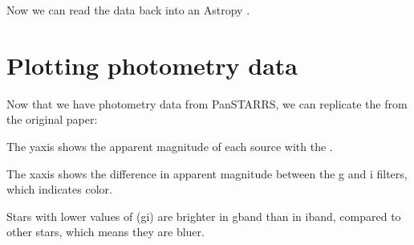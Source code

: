 \documentclass[letterpaper,10pt,english]{sphinxmanual}
\begin{document}
\begin{sphinxVerbatim}[commandchars=\\\{\}]
 
   

  
  

  
\end{sphinxVerbatim}

Now we can read the data back into an Astropy .

\begin{sphinxVerbatim}[commandchars=\\\{\}]
   

  
\end{sphinxVerbatim}


\section{Plotting photometry data}
\label{\detokenize{06_photo:plotting-photometry-data}}
Now that we have photometry data from Pan\sphinxhyphen{}STARRS, we can replicate the  from the original paper:



The y\sphinxhyphen{}axis shows the apparent magnitude of each source with the .

The x\sphinxhyphen{}axis shows the difference in apparent magnitude between the g and i filters, which indicates color.

Stars with lower values of (g\sphinxhyphen{}i) are brighter in g\sphinxhyphen{}band than in i\sphinxhyphen{}band, compared to other stars, which means they are bluer.
\end{document}
